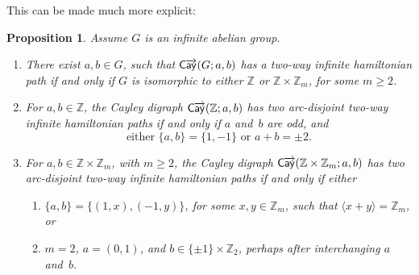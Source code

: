 \documentclass[11pt]{amsart}
\newtheorem{prop}[equation]{Proposition}
\theoremstyle{definition}
\numberwithin{case}{startcases}
\numberwithin{equation}{section}
\newcommand{\Z}{\mathbb{Z}}  %
\newcommand{\cayd}{\mathop{\mathsf{C}\mkern-1mu\overrightarrow{\mathsf{ay}}}}
\begin{document}
	This can be made much more explicit:
	
	\begin{prop} \label{infiniteAD}
		Assume $G$ is an infinite abelian group.
		\begin{enumerate}
			\item \label{infiniteAD-ab}
			There exist $a,b \in G$, such that $\cayd(G; a, b)$ has a two-way infinite hamiltonian path if and only if $G$ is isomorphic to either $\Z$ or $\Z \times \Z_m$, for some $m \ge 2$.
			\item \label{infiniteAD-Z}
			For $a,b \in \Z$, the Cayley digraph $\cayd(\Z; a,b)$ has two arc-disjoint two-way infinite hamiltonian paths if and only if $a$ and~$b$ are odd, and
			\[ \text{either $\{a,b\} = \{1, -1\}$ or $a + b = \pm 2$}. \]
			\item \label{infiniteAD-ZxZm}
			For $a,b \in \Z \times \Z_m$, with $m \ge 2$, the Cayley digraph $\cayd(\Z \times \Z_m; a,b)$ has two arc-disjoint two-way infinite hamiltonian paths if and only if either
			\begin{enumerate}
				\item \label{infiniteAD-ZxZm-xy}
				$\{a,b\} = \{ (1, x), (-1, y)\}$, for some $x,y \in \Z_m$, such that $\langle x + y \rangle = \Z_m$,
				or
				\item \label{infiniteAD-ZxZm-2}
				$m = 2$, $a = (0,1)$, and $b \in \{\pm 1\} \times \Z_2$, perhaps after interchanging $a$ and~$b$.
			\end{enumerate}
		\end{enumerate}
	\end{prop}
	
\end{document}

